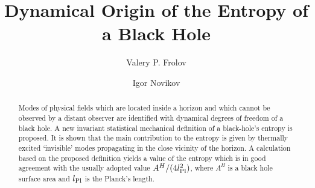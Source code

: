 \documentclass[superscriptaddress,showpacs,preprintnumbers,amsmath,amssymb,
nofootinbib,aps,prd,12pt]{revtex4-1}
\begin{document}
\title{Dynamical Origin of the Entropy of a Black Hole}

\author{Valery P. Frolov}
\author{Igor Novikov}





\begin{abstract}
Modes of physical fields which are located inside a horizon and  which
cannot be observed by a distant observer are identified with dynamical
degrees  of  freedom  of  a  black  hole.  A new invariant statistical
mechanical definition  of a  black-hole's  entropy  is  proposed.   It
is   shown   that   the main  contribution to  the entropy is given by
thermally excited  `invisible' modes propagating in the close vicinity
of  the  horizon.  A   calculation  based  on  the proposed definition
yields a value of the  entropy which is   in   good  agreement    with
the   usually  adopted    value $A^H /(4l^2_{\mbox{\scriptsize{Pl}}})$,
where  $A^H$ is  a  black  hole  surface  area  and
$l_{\mbox{\scriptsize{Pl}}}$ is the Planck's length.
\end{abstract}
\end{document}
